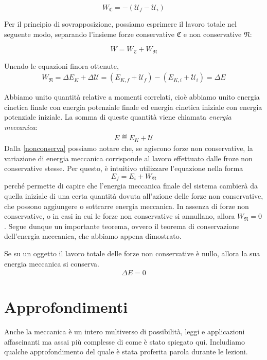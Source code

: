 \[ W_\mathfrak{C} = -(\mathcal{U}_f - \mathcal{U}_i) \]

\noindent Per il principio di sovrapposizione, possiamo esprimere il lavoro totale
nel seguente modo, separando l'insieme forze conservative $\mathfrak{C}$ e non conservative $\mathfrak{N}$:

\[ W = W_\mathfrak{C} + W_\mathfrak{N} \]

\noindent Unendo le equazioni finora ottenute,
\begin{align}
    W_\mathfrak{N} = \Delta E_K + \Delta\mathcal{U} = (E_{K,f} + \mathcal{U}_f) - (E_{K,i} + \mathcal{U}_i) = \Delta E\label{nonconserva}
\end{align}

\noindent Abbiamo unito quantità relative a momenti correlati,
cioè abbiamo unito energia cinetica finale con energia potenziale finale
ed energia cinetica iniziale con energia potenziale iniziale.
La somma di queste quantità viene chiamata \textit{energia meccanica}:
\begin{align}
    E \eqdef E_K + \mathcal{U}
\end{align}
Dalla \ref{nonconserva} possiamo notare che, se agiscono forze non conservative,
la variazione di energia meccanica corrisponde al lavoro effettuato dalle
froze non conservative stesse. Per questo, è intuitivo utilizzare l'equazione
nella forma
\[ E_f = E_i + W_\mathfrak{N} \]
perché permette di capire che l'energia meccanica finale del sistema cambierà
da quella iniziale di una certa quantità dovuta all'azione delle forze non
conservative, che possono aggiungere o sottrarre energia meccanica.
In assenza di forze non conservative, o in casi in cui le forze non
conservative si annullano, allora $W_\mathfrak{N} = 0$.
Segue dunque un importante teorema, ovvero il teorema di conservazione
dell'energia meccanica, che abbiamo appena dimostrato.

\vspace{8pt}
\begin{tcolorbox}[colback = red!30, colframe = red!30!black, title = {Teorema di conservazione dell'energia meccanica}]
    Se su un oggetto il lavoro totale delle forze non conservative è nullo,
    allora la sua energia meccanica si conserva.
    \begin{align}
        \Delta E = 0
    \end{align}
\end{tcolorbox}
\vspace{5pt}


\section{Approfondimenti}
Anche la meccanica è un intero multiverso di possibilità, leggi e
applicazioni affascinanti ma assai più complesse di come è stato
spiegato qui. Includiamo qualche approfondimento del quale è stata
proferita parola durante le lezioni.

